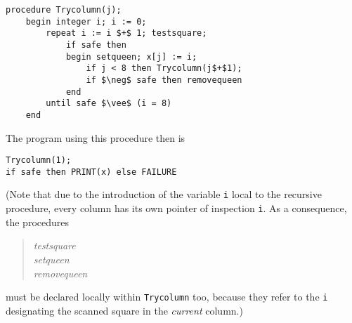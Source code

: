 \begin{lstlisting}
procedure Trycolumn(j);
    begin integer i; i := 0;
        repeat i := i $+$ 1; testsquare;
            if safe then
            begin setqueen; x[j] := i;
                if j < 8 then Trycolumn(j$+$1);
                if $\neg$ safe then removequeen
            end
        until safe $\vee$ (i = 8)
    end
\end{lstlisting}

The program using this procedure then is

\begin{lstlisting}
Trycolumn(1);
if safe then PRINT(x) else FAILURE
\end{lstlisting}

(Note that due to the introduction of the variable \verb|i| local to the
recursive procedure, every column has its own pointer of inspection \verb|i|.
As a consequence, the procedures

\begin{quote}
\emph{testsquare}\\
\emph{setqueen}\\
\emph{removequeen }\\
\end{quote}

must be declared locally within \verb|Trycolumn| too, because they refer to the
\verb|i| designating the scanned square in the \emph{current} column.)

